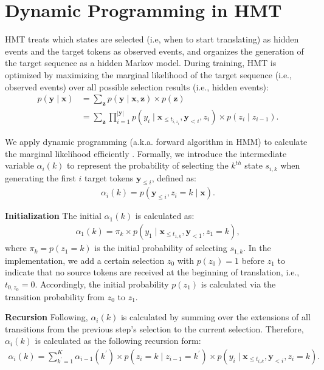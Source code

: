 \documentclass{article} %
\begin{document}
\section{Dynamic Programming in HMT}
\label{sec:dp}

HMT treats which states are selected (i.e, when to start translating) as hidden events and the target tokens as observed events, and organizes the generation of the target sequence as a hidden Markov model. During training, HMT is optimized by maximizing the marginal likelihood of the target sequence (i.e., observed events) over all possible selection results (i.e., hidden events):
\begin{align}
    p\!\left ( \mathbf{y}\mid \mathbf{x} \right )&=\sum_{\mathbf{z}}p\!\left ( \mathbf{y}\mid \mathbf{x},\mathbf{z} \right ) \times p\!\left ( \mathbf{z} \right ) \\
    &=\sum_{\mathbf{z}}\prod_{i=1}^{\left| \mathbf{y}\right|}p\!\left (y_{i}\mid \mathbf{x}_{\leq t_{i,z_{i}}},\mathbf{y}_{<i}, z_{i}  \right )\times p\!\left ( z_{i}\mid z_{i-1}  \right ).
\end{align}


We apply dynamic programming (a.k.a. forward algorithm in HMM) to calculate the marginal likelihood efficiently \citep{10.2307/2238772}.
Formally, we introduce the intermediate variable $\alpha_{i}\left(k\right)$ to represent the probability of selecting the $k^{th}$ state $s_{i,k}$ when generating the first $i$ target tokens $\mathbf{y}_{\leq i}$, defined as:
\begin{gather}
    \alpha_{i}\left(k\right)=p\!\left(\mathbf{y}_{\leq i}, z_{i}=k \mid \mathbf{x}\right).
\end{gather}

\textbf{Initialization} The initial $\alpha_{1}\left(k\right)$ is calculated as:
\begin{gather}
    \alpha_{1}\left(k\right)=\pi_{k} \times p\!\left (y_{1}\mid \mathbf{x}_{\leq t_{1,k}},\mathbf{y}_{<1},z_{1}=k  \right ),
\end{gather}
where $\pi_{k}=p\!\left ( z_{1}\!=\!k  \right )$ is the initial probability of selecting $s_{1,k}$. In the implementation, we add a certain selection $z_{0}$ with $p\!\left ( z_{0}  \right )\!=\!1$ before $z_{1}$ to indicate that no source tokens are received at the beginning of translation, i.e., $t_{0,z_{0}}\!=\!0$. Accordingly, the initial probability $p\!\left ( z_{1} \right )$ is calculated via the transition probability from $z_{0}$ to $z_{1}$.

\textbf{Recursion} Following, $\alpha_{i}\left(k\right)$ is calculated by summing over the extensions of all transitions from the previous step's selection to the current selection. Therefore, $\alpha_{i}\left(k\right)$ is calculated as the following recursion form:
\begin{gather}
    \alpha_{i}\left(k\right)=\sum_{k^{'}=1}^{K} \alpha_{i-1}\left(k^{'}\right) \times p\!\left ( z_{i}=k\mid z_{i-1}=k^{'}  \right ) \times p\!\left (y_{i}\mid \mathbf{x}_{\leq t_{i,k}},\mathbf{y}_{<i},z_{i}=k  \right ).
\end{gather}
\end{document}

